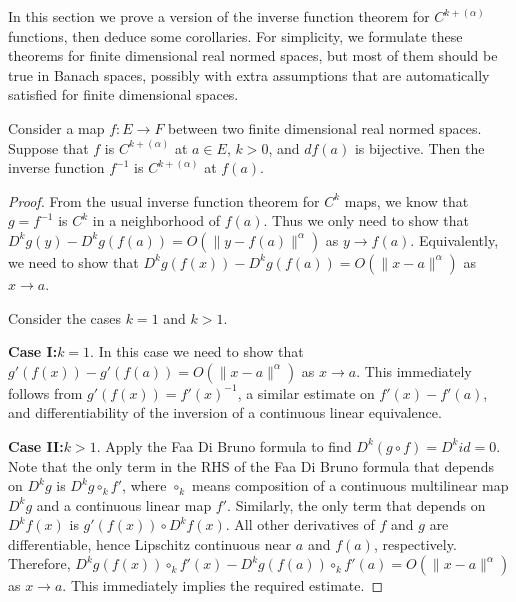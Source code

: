 In this section we prove a version of the inverse function theorem for \(C^{k+(\alpha)}\) functions,
then deduce some corollaries.
For simplicity, we formulate these theorems for finite dimensional real normed spaces,
but most of them should be true in Banach spaces,
possibly with extra assumptions that are automatically satisfied for finite dimensional spaces.

\begin{theorem}%
  \label{thm:cdh-at-inverse}
  Consider a map \(f\colon E\to F\) between two finite dimensional real normed spaces.
  Suppose that \(f\) is \(C^{k+(\alpha)}\) at \(a \in E\), \(k > 0\), and \(df(a)\) is bijective.
  Then the inverse function \(f^{-1}\) is \(C^{k+(\alpha)}\) at \(f(a)\).
\end{theorem}
\begin{proof}
  From the usual inverse function theorem for \(C^{k}\) maps,
  we know that \(g=f^{-1}\) is \(C^{k}\) in a neighborhood of \(f(a)\).
  Thus we only need to show that \(D^{k}g(y)-D^{k}g(f(a)) = O\left(\|y - f(a)\|^{\alpha}\right)\) as \(y \to f(a)\).
  Equivalently, we need to show that \(D^{k}g(f(x)) - D^{k}g(f(a)) = O\left(\|x - a\|^{\alpha}\right)\) as \(x\to a\).

  Consider the cases \(k = 1\) and \(k > 1\).

  \textbf{Case I:\@\(k = 1\)}. In this case we need to show that
  \(g'(f(x)) - g'(f(a)) = O\left(\|x - a\|^{\alpha}\right)\) as \(x\to a\).
  This immediately follows from \(g'(f(x)) = {f'(x)}^{-1}\),
  a similar estimate on \(f'(x) - f'(a)\),
  and differentiability of the inversion of a continuous linear equivalence.

  \textbf{Case II:\@\(k > 1\)}.
  Apply the Faa Di Bruno formula to find \(D^{k}(g \circ f) = D^{k} id =0\).
  Note that the only term in the RHS of the Faa Di Bruno formula
  that depends on \(D^{k}g\) is \(D^{k}g\circ_{k} f'\),
  where \(\circ_{k}\) means composition of a continuous multilinear map \(D^{k}g\)
  and a continuous linear map \(f'\).
  Similarly, the only term that depends on \(D^{k}f(x)\) is \(g'(f(x))\circ D^{k}f(x)\).
  All other derivatives of \(f\) and \(g\) are differentiable,
  hence Lipschitz continuous near \(a\) and \(f(a)\), respectively.
  Therefore, \(D^{k}g(f(x))\circ_{k}f'(x) - D^{k}g(f(a))\circ_{k}f'(a)=O\left(\|x - a\|^{\alpha}\right)\) as \(x\to a\).
  This immediately implies the required estimate.
\end{proof}


